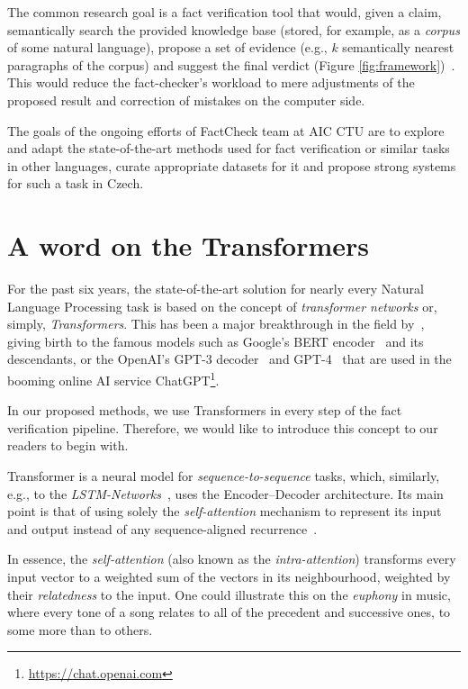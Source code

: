 The common research goal is a fact verification tool that would, given a claim, semantically search the provided knowledge base (stored, for example, as a \textit{corpus} of some natural language), propose a set of evidence (e.g., $k$ semantically nearest paragraphs of the corpus) and suggest the final verdict (Figure \ref{fig:framework})~\cite{guo-etal-2022-survey}. This would reduce the fact-checker's workload to mere adjustments of the proposed result and correction of mistakes on the computer side. 

The goals of the ongoing efforts of {\textsf{FactCheck}} team at {\textsf{AIC CTU}} are to explore and adapt the state-of-the-art methods used for fact verification or similar tasks in other languages, curate appropriate datasets for it and propose strong systems for such a task in Czech.


\section{A word on the Transformers}
\label{sec:transformers}
For the past six years, the state-of-the-art solution for nearly every Natural Language Processing task is based on the concept of \textit{transformer networks} or, simply, \textit{Transformers}. This has been a major breakthrough in the field by~\cite{vaswani}, giving birth to the famous models such as \textsf{Google}'s \textsf{BERT} encoder~\cite{devlin2019bert} and its descendants, or the \textsf{OpenAI}'s \textsf{GPT-3} decoder~\cite{gpt3} and \textsf{GPT-4}~\cite{gpt4} that are used in the booming online AI service \textsf{ChatGPT}\footnote{\url{https://chat.openai.com}}.

In our proposed methods, we use Transformers in every step of the fact verification pipeline. Therefore, we would like to introduce this concept to our readers to begin with. 

Transformer is a neural model for \textit{sequence-to-sequence} tasks, which, similarly, e.g., to the \textit{LSTM-Networks}~\cite{lstm}, uses the Encoder--Decoder architecture. Its main point is that of using solely the \textit{self-attention} mechanism to represent its input and output instead of any sequence-aligned recurrence~\cite{vaswani}.

In essence, the \textit{self-attention} (also known as the \textit{intra-attention}) transforms every input vector to a weighted sum of the vectors in its neighbourhood, weighted by their \textit{relatedness} to the input. One could illustrate this on the \textit{euphony} in music, where every tone of a song relates to all of the precedent and successive ones, to some more than to others.

